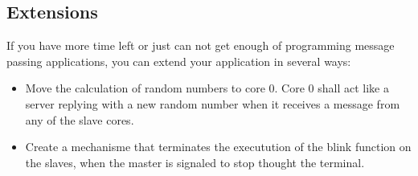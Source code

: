 \documentclass[a4paper,fontsize=10pt,twoside,DIV15,BCOR12mm,headinclude=true,footinclude=false,pagesize,bibtotoc]{scrbook}
\newcommand{\nopublish}[1]{}
\begin{document}
\subsection{Extensions}
If you have more time left or just can not get enough of programming message passing applications, you can extend your application  in several ways:
\begin{itemize}
\item Move the calculation of random numbers to core 0.
Core 0 shall act like a server replying with a new random number when it receives a message from any of the slave cores.
\item Create a mechanisme that terminates the executution of the blink function on the slaves, when the master is signaled to stop thought the terminal. 
\end{itemize}

\nopublish{

\section{Circulating tokens - WCET}

This exercise will show how to calculate the maximum worst case throughput of tokens.
The exercise comprise the following tasks:
\begin{itemize}
\item Compile with platin
\item 
\label{list:ex2:num1}\end{itemize}

\section{Next exercise}

Ideas to other exercises:
\begin{itemize}
\item WCET analysis of the circulating tokens
  \begin{itemize}
  \item Worst case throughput of tokens
  \item Worst case latency of a token through two processors
  \end{itemize}
\item Health monitoring 
\item I/O server
\end{itemize}

}
\appendix
\end{document}
